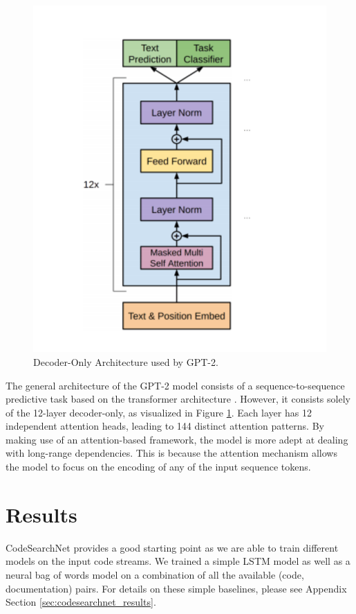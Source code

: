 \documentclass[10pt,twocolumn]{article}
\begin{document}
\begin{figure}[!ht]
    \centering
    \includegraphics[scale=0.2]{figures/gpt-arch.png}
    \caption{Decoder-Only Architecture used by GPT-2.}
    \label{fig:gpt2_architecture}
\end{figure}

The general architecture of the GPT-2 model consists of a sequence-to-sequence predictive task based on the transformer architecture \cite{attentionisallyouneed} \cite{gpt2}. However, it consists solely of the 12-layer decoder-only, as visualized in Figure \ref{fig:gpt2_architecture}. Each layer has 12 independent attention heads, leading to 144 distinct attention patterns. By making use of an attention-based framework, the model is more adept at dealing with long-range dependencies. This is because the attention mechanism allows the model to focus on the encoding of any of the input sequence tokens. 

\section{Results}
\label{sec:results}
CodeSearchNet provides a good starting point as we are able to train different models on the input code streams. We trained a simple LSTM model as well as a neural bag of words model on a combination of all the available (code, documentation) pairs. For details on these simple baselines, please see Appendix Section \ref{sec:codesearchnet_results}.
\end{document}
